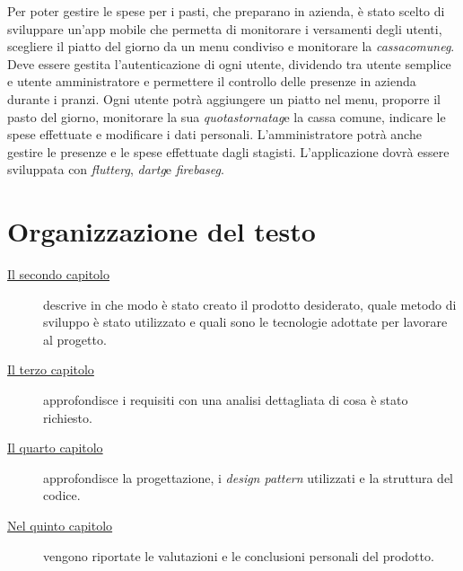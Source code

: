 Per poter gestire le spese per i pasti, che preparano in azienda, è stato scelto di sviluppare un'app mobile che permetta di monitorare i versamenti degli utenti, scegliere il piatto del giorno da un menu condiviso e monitorare la \emph{\gls{cassacomuneg}}\glsfirstoccur.\newline
Deve essere gestita l'autenticazione di ogni utente, dividendo tra utente semplice e utente amministratore e permettere il controllo delle presenze in azienda durante i pranzi. \newline
Ogni utente potrà aggiungere un piatto nel menu, proporre il pasto del giorno, monitorare la sua \emph{\gls{quotastornatag}}\glsfirstoccur e la cassa comune, indicare le spese effettuate e modificare i dati personali. \newline
L'amministratore potrà anche gestire le presenze e le spese effettuate dagli stagisti.
L'applicazione dovrà essere sviluppata con \emph{\gls{flutterg}}\glsfirstoccur, \emph{\gls{dartg}}\glsfirstoccur  e \emph{\gls{firebaseg}}\glsfirstoccur.

\section{Organizzazione del testo}

\begin{description}
    \item[{\hyperref[cap:processi-metodologie]{Il secondo capitolo}}] descrive in che modo è stato creato il prodotto desiderato, quale metodo di sviluppo è stato utilizzato e quali sono le tecnologie adottate per lavorare al progetto.
    
    
    \item[{\hyperref[cap:analisi-requisiti]{Il terzo capitolo}}] approfondisce i requisiti con una analisi dettagliata di cosa è stato richiesto.
    
    \item[{\hyperref[cap:progettazione-codifica]{Il quarto capitolo}}] approfondisce la progettazione, i \emph{design pattern} utilizzati e la struttura del codice.
    
    
    \item[{\hyperref[cap:conclusioni]{Nel quinto capitolo}}] vengono riportate le valutazioni e le conclusioni personali del prodotto.
\end{description}


